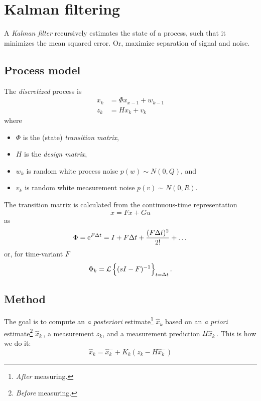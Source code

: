 \section{Kalman filtering}

A \emph{Kalman filter} recursively estimates the state of a process, such that it minimizes the mean squared error. Or, maximize separation of signal and noise.

\subsection{Process model}

The \emph{discretized} process is
\begin{equation}
\begin{split}
	x_k &= \Phi x_{x-1} + w_{k-1} \\
	z_k &= H x_k + v_k
\end{split}
\end{equation}
where
\begin{itemize}
	\item $\Phi$ is the (state) \emph{transition matrix},
	\item $H$ is the \emph{design matrix},
	\item $w_k$ is random white process noise $p(w) \sim N(0,Q)$, and
	\item $v_k$ is random white measurement noise $p(v) \sim N(0,R)$.
\end{itemize}

The transition matrix is calculated from the continuous-time representation
\begin{equation}
	\dot{x} = F x + G u
\end{equation}
as
\begin{equation}
	\Phi = \mathrm{e}^{F \Delta t} = I + F \Delta t + \frac{(F \Delta t)^2}{2!} + \dots
\end{equation}
or, for time-variant $F$
\begin{equation}
	\Phi_k = \mathcal{L} \left\{ (sI - F)^{-1} \right\}_{t = \Delta t}.
\end{equation}

\subsection{Method}

The goal is to compute an \emph{a posteriori} estimate\footnote{\emph{After} measuring.} $\hat{x}_k$ based on an \emph{a priori} estimate\footnote{\emph{Before} measuring.} $\hat{x}_k^-$, a measurement $z_k$, and a measurement prediction $H \hat{x}_k^-$. This is how we do it:
\begin{equation}
	\hat{x}_k = \hat{x}_k^- + K_k(z_k - H \hat{x}_k^-)
\end{equation}

